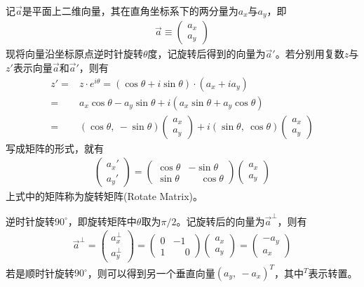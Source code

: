 \begin{example}[平面向量的旋转]
  记$\vec a$是平面上二维向量，其在直角坐标系下的两分量为$a_x$与$a_y$，即
  \begin{align*}
    \vec a\equiv
    \begin{pmatrix}
      a_x\\ a_y
    \end{pmatrix}
  \end{align*}
  现将向量沿坐标原点逆时针旋转$\theta$度，记旋转后得到的向量为$\vec a'$。若分别用复数$z$与$z'$表示向量$\vec a$和$\vec a'$，则有
  \begin{align*}
    z' ={}& z\cdot e^{i\theta} = (\cos\theta + i\sin\theta)\cdot (a_x + i a_y)\\
       ={}& a_x \cos\theta - a_y \sin\theta + i(a_x \sin\theta + a_y \cos\theta)\\
       ={}& (\cos\theta,\ -\sin\theta)\begin{pmatrix}a_x\\a_y\end{pmatrix} + i
            (\sin\theta,\  \cos\theta)\begin{pmatrix}a_x\\a_y\end{pmatrix}
  \end{align*}
  写成矩阵的形式，就有
  \begin{align*}
    \begin{pmatrix}
      a_x'\\ a_y'
    \end{pmatrix}=
    \begin{pmatrix}
      \cos\theta & -\sin\theta\\
      \sin\theta & \phantom{-}\cos\theta
    \end{pmatrix}
    \begin{pmatrix}
      a_x\\ a_y
    \end{pmatrix}
  \end{align*}
  上式中的矩阵称为旋转矩阵(Rotate Matrix)。
\end{example}

\begin{example}[垂直向量]
  逆时针旋转$90^\circ$，即旋转矩阵中$\theta$取为$\pi/2$。记旋转后的向量为$\vec a^\perp$，则有
  \begin{align*}
    \vec a^\perp = 
    \begin{pmatrix}
      a_x^\perp\\ a_y^\perp
    \end{pmatrix}=
    \begin{pmatrix}
      0 & -1\\
      1 & \phantom{-}0
    \end{pmatrix}
    \begin{pmatrix}
      a_x\\ a_y
    \end{pmatrix}=
    \begin{pmatrix}
      -a_y\\ a_x
    \end{pmatrix}
  \end{align*}
  若是顺时针旋转$90^\circ$，则可以得到另一个垂直向量$(a_y,\ -a_x)^T$，其中$^T$表示转置。
\end{example}

